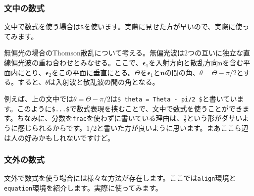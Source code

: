\documentclass[a4paper,papersize,uplatex,dvipdfmx,10pt]{jsarticle}
\newcommand{\bs}{\symbol{92}} %
\begin{document}
\subsubsection{文中の数式} %
文中で数式を使う場合は\texttt{\$}を使います。実際に見せた方が早いので、実際に使ってみます。

\begin{tcolorbox}[title=文中の数式表現の例]
  無偏光の場合のThomson散乱について考える。無偏光波は2つの互いに独立な直線偏光波の重ね合わせとみなせる。ここで、$\bm{\epsilon}_{1}$を入射方向と散乱方向$\bm{n}$を含む平面内にとり、$\bm{\epsilon}_{2}$をこの平面に垂直にとる。$\Theta$を$\bm{\epsilon}_{1}$と$\bm{n}$の間の角、$\theta = \Theta - \pi/2$とする。すると、$\theta$は入射波と散乱波の間の角となる。
\end{tcolorbox}

例えば、上の文中では$\theta = \Theta - \pi/2$は\texttt{\$ \bs theta = \bs Theta - \bs pi/2 \$}と書いています。このように\texttt{\$...\$}で数式表現を挟むことで、文中で数式を使うことができます。ちなみに、分数を\texttt{\bs frac}を使わずに書いている理由は、$\frac{1}{2}$という形がダサいように感じられるからです。$1/2$と書いた方が良いように思います。まあここら辺は人の好みかもしれないですけど。

\subsubsection{文外の数式} %
文外で数式を使う場合には様々な方法が存在します。ここでは\texttt{align}環境と\texttt{equation}環境を紹介します。実際に使ってみます。
\end{document}
